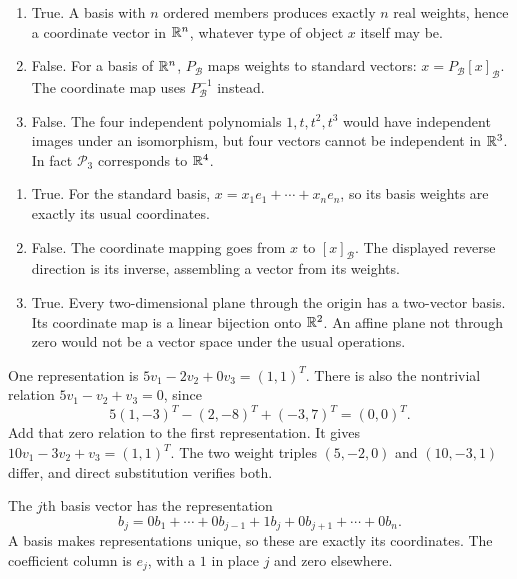 \begin{enumerate}[label=(\alph*)]
\item True. A basis with $n$ ordered members produces exactly $n$
real weights, hence a coordinate vector in $\mathbb{R}^n$, whatever type of
object $x$ itself may be.
\item False. For a basis of $\mathbb{R}^n$, $P_{\mathcal B}$ maps weights to
standard vectors: $x=P_{\mathcal B}[x]_{\mathcal B}$. The coordinate
map uses $P_{\mathcal B}^{-1}$ instead.
\item False. The four independent polynomials $1,t,t^2,t^3$ would have
independent images under an isomorphism, but four vectors cannot be
independent in $\mathbb{R}^3$. In fact $\mathcal P_3$ corresponds to $\mathbb{R}^4$.
\end{enumerate}

\begin{enumerate}[label=(\alph*)]
\item True. For the standard basis, $x=x_1e_1+\cdots+x_ne_n$,
so its basis weights are exactly its usual coordinates.
\item False. The coordinate mapping goes from $x$ to $[x]_{\mathcal B}$.
The displayed reverse direction is its inverse, assembling a vector
from its weights.
\item True. Every two-dimensional plane through the origin has a two-vector
basis. Its coordinate map is a linear bijection onto $\mathbb{R}^2$. An affine
plane not through zero would not be a vector space under the usual operations.
\end{enumerate}

One representation is $5v_1-2v_2+0v_3=(1,1)^T$.
There is also the nontrivial relation $5v_1-v_2+v_3=0$, since
\[
5(1,-3)^T-(2,-8)^T+(-3,7)^T=(0,0)^T.
\]
Add that zero relation to the first representation. It gives
$10v_1-3v_2+v_3=(1,1)^T$.
The two weight triples $(5,-2,0)$ and $(10,-3,1)$ differ, and direct
substitution verifies both.

The $j$th basis vector has the representation
\[
b_j=0b_1+\cdots+0b_{j-1}+1b_j+0b_{j+1}+\cdots+0b_n.
\]
A basis makes representations unique, so these are exactly its
coordinates. The coefficient column is $e_j$, with a $1$ in place $j$
and zero elsewhere.

